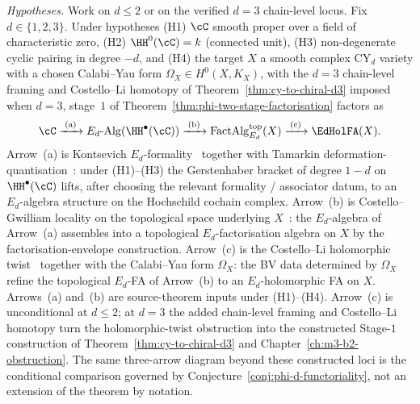 \begin{proposition}
\label{prop:phi-fa-three-arrow-assembly}
\noindent\emph{Hypotheses.} Work on $d\leq2$ or on the verified $d=3$ chain-level locus.
Fix $d \in \{1,2,3\}$. Under hypotheses \textup{(H1)} $\cC$ smooth proper over a field of characteristic zero, \textup{(H2)} $\HH^0(\cC) = k$ \textup{(}connected unit\textup{),} \textup{(H3)} non-degenerate cyclic pairing in degree $-d$, and \textup{(H4)} the target $X$ a smooth complex CY$_d$ variety with a chosen Calabi--Yau form $\Omega_X \in H^0(X, K_X)$, with the $d=3$ chain-level framing and Costello--Li homotopy of Theorem~\ref{thm:cy-to-chiral-d3} imposed when $d=3$, stage~$1$ of Theorem~\ref{thm:phi-two-stage-factorisation} factors as
\[
 \cC
 \xrightarrow{\;(\mathrm{a})\;}
 E_d\text{-}\mathrm{Alg}(\HH^\bullet(\cC))
 \xrightarrow{\;(\mathrm{b})\;}
 \mathrm{FactAlg}_{E_d}^{\mathrm{top}}(X)
 \xrightarrow{\;(\mathrm{c})\;}
 \EdHolFA(X).
\]
Arrow~\textup{(a)} is Kontsevich $E_d$-formality~\cite{Kontsevich1999} together with Tamarkin deformation-quantisation~\cite{Tamarkin2007}: under \textup{(H1)--(H3)} the Gerstenhaber bracket of degree $1 - d$ on $\HH^\bullet(\cC)$ lifts, after choosing the relevant formality / associator datum, to an $E_d$-algebra structure on the Hochschild cochain complex. Arrow~\textup{(b)} is Costello--Gwilliam locality on the topological space underlying $X$~\cite{CostelloGwilliam2017}: the $E_d$-algebra of Arrow~\textup{(a)} assembles into a topological $E_d$-factorisation algebra on $X$ by the factorisation-envelope construction. Arrow~\textup{(c)} is the Costello--Li holomorphic twist~\cite{CostelloLi2016,CostelloLi2020} together with the Calabi--Yau form $\Omega_X$: the BV data determined by $\Omega_X$ refine the topological $E_d$-FA of Arrow~\textup{(b)} to an $E_d$-holomorphic FA on $X$. Arrows~\textup{(a)} and~\textup{(b)} are source-theorem inputs under \textup{(H1)--(H4)}. Arrow~\textup{(c)} is unconditional at $d \leq 2$; at $d=3$ the added chain-level framing and Costello--Li homotopy turn the holomorphic-twist obstruction into the constructed Stage-$1$ construction of Theorem~\ref{thm:cy-to-chiral-d3} and Chapter~\ref{ch:m3-b2-obstruction}. The same three-arrow diagram beyond these constructed loci is the conditional comparison governed by Conjecture~\ref{conj:phi-d-functoriality}, not an extension of the theorem by notation.
\end{proposition}

